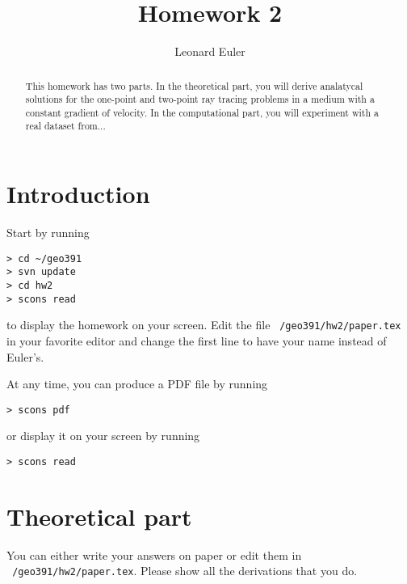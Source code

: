 \author{Leonard Euler} 
\title{Homework 2}

\begin{abstract}
This homework has two parts. In the theoretical part, you will derive
analatycal solutions for the one-point and two-point ray tracing
problems in a medium with a constant gradient of velocity. In the
computational part, you will experiment with a real dataset from...
\end{abstract}

\section{Introduction}

Start by running
\begin{verbatim}
> cd ~/geo391
> svn update
> cd hw2
> scons read
\end{verbatim}
to display the homework on your screen. Edit the file
\texttt{~/geo391/hw2/paper.tex} in your favorite editor and change the
first line to have your name instead of Euler's. 

At any time, you can
produce a PDF file by running
\begin{verbatim}
> scons pdf
\end{verbatim}
or display it on your screen by running
\begin{verbatim}
> scons read
\end{verbatim}

\section{Theoretical part}

You can either write your answers on paper or edit them in
\texttt{~/geo391/hw2/paper.tex}. Please show all the derivations that
you do.

